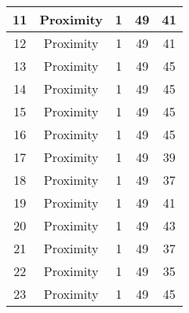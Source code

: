 \documentclass[results.tex]{subfiles}
\begin{document}
\begin{center}
\begin{tabular}{| c || c | c | c | c |}
            \hline
            11                      & Proximity                    & 1                      & 49                      & 41                   \\
            \hline
            12                      & Proximity                    & 1                      & 49                      & 41                   \\
            \hline
            13                      & Proximity                    & 1                      & 49                      & 45                   \\
            \hline
            14                      & Proximity                    & 1                      & 49                      & 45                   \\
            \hline
            15                      & Proximity                    & 1                      & 49                      & 45                   \\
            \hline
            16                      & Proximity                    & 1                      & 49                      & 45                   \\
            \hline
            17                      & Proximity                    & 1                      & 49                      & 39                   \\
            \hline
            18                      & Proximity                    & 1                      & 49                      & 37                   \\
            \hline
            19                      & Proximity                    & 1                      & 49                      & 41                   \\
            \hline
            20                      & Proximity                    & 1                      & 49                      & 43                   \\
            \hline
            21                      & Proximity                    & 1                      & 49                      & 37                   \\
            \hline
            22                      & Proximity                    & 1                      & 49                      & 35                   \\
            \hline
            23                      & Proximity                    & 1                      & 49                      & 45                   \\

\end{tabular}
\end{center}
\end{document}
